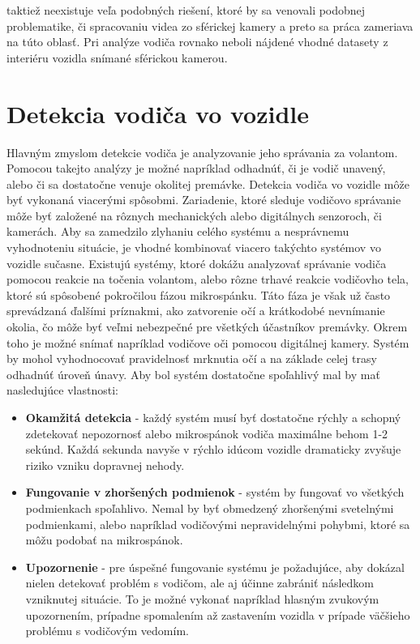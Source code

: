 \documentclass[slovak,master,dept460,male,cpp,cpdeclaration]{diploma}
\begin{document}
taktiež neexistuje veľa podobných riešení, ktoré by sa venovali podobnej problematike, či spracovaniu videa zo sférickej kamery a preto sa práca zameriava na túto oblasť. Pri analýze vodiča rovnako neboli nájdené vhodné datasety z interiéru vozidla snímané sférickou kamerou.




\newpage
\section{Detekcia vodiča vo vozidle}
\label{sec:Pose detection}
Hlavným zmyslom detekcie vodiča je analyzovanie jeho správania za volantom.  Pomocou takejto analýzy je možné napríklad odhadnúť, či je vodič unavený, alebo či sa dostatočne venuje okolitej premávke. Detekcia vodiča vo vozidle môže byť vykonaná viacerými spôsobmi. Zariadenie, ktoré sleduje vodičovo správanie môže byť založené na rôznych mechanických alebo digitálnych senzoroch, či kamerách. Aby sa zamedzilo zlyhaniu celého systému a nesprávnemu vyhodnoteniu situácie, je vhodné kombinovať viacero takýchto systémov vo vozidle sučasne. Existujú systémy, ktoré dokážu analyzovať správanie vodiča pomocou reakcie na točenia volantom, alebo rôzne trhavé reakcie vodičovho tela, ktoré sú spôsobené pokročilou fázou mikrospánku. Táto fáza je však už často sprevádzaná ďalšími príznakmi, ako zatvorenie očí a  krátkodobé nevnímanie okolia, čo môže byť veľmi nebezpečné pre všetkých účastníkov premávky.  Okrem toho je možné snímať napríklad  vodičove oči pomocou digitálnej kamery. Systém by mohol vyhodnocovať  pravidelnosť mrknutia očí a na základe celej trasy odhadnúť úroveň únavy. Aby bol systém dostatočne spoľahlivý mal by mať nasledujúce vlastnosti:
\begin{itemize}
\item \textbf{Okamžitá detekcia} - každý systém musí byť dostatočne rýchly a schopný zdetekovať nepozornosť alebo mikrospánok vodiča maximálne behom 1-2 sekúnd. Každá sekunda navyše v rýchlo idúcom vozidle dramaticky zvyšuje riziko vzniku dopravnej nehody.
\item \textbf{Fungovanie v zhoršených podmienok} - systém by  fungovať vo všetkých podmienkach  spoľahlivo. Nemal by byť obmedzený zhoršenými svetelnými podmienkami, alebo napríklad vodičovými nepravidelnými pohybmi, ktoré sa môžu podobať na mikrospánok.
\item \textbf{Upozornenie} - pre úspešné fungovanie systému je požadujúce, aby dokázal nielen detekovať problém s vodičom, ale aj účinne zabrániť následkom vzniknutej situácie. To je možné vykonať napríklad hlasným zvukovým upozornením, prípadne spomalením až zastavením vozidla v prípade väčšieho problému s vodičovým vedomím. 
\end{itemize}
\end{document}
